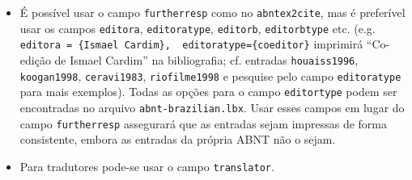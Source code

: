 \documentclass[a4paper]{article}
\begin{document}
\begin{itemize}
    \item É possível usar o campo \verb`furtherresp` como no \verb`abntex2cite`, mas é preferível usar os campos \verb`editora`, \verb`editoratype`, \verb`editorb`, \verb`editorbtype` etc. (e.g. \verb`editora = {Ismael Cardim},  editoratype={coeditor}` imprimirá ``Co-edição de Ismael Cardim'' na bibliografia; cf. entradas \verb`houaiss1996`, \verb`koogan1998`, \verb`ceravi1983`, \verb`riofilme1998` e pesquise pelo campo \verb`editoratype` para mais exemplos). Todas as opções para o campo \verb`editortype` podem ser encontradas no arquivo \verb`abnt-brazilian.lbx`. Usar esses campos em lugar do campo \verb`furtherresp` assegurará que as entradas sejam impressas de forma consistente, embora as entradas da própria ABNT não o sejam.
    \item Para tradutores pode-se usar o campo \verb`translator`.
\end{itemize}

\clearpage
\nocite{*}
\printbibliography
\end{document}

